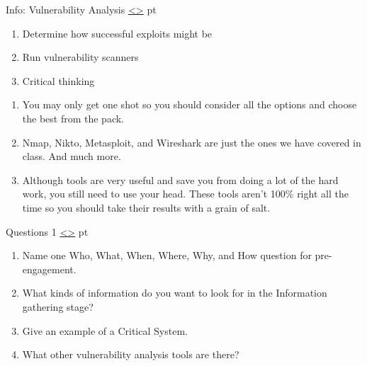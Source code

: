 \documentclass[12pt]{extarticle}
\newenvironment{instructionblock}{\Large\bgroup}{\egroup}
\newcounter{next}
\newcounter{prev}
\begin{document}
\pagebreak
{}
\begin{slide}{Info: Vulnerability Analysis}
{\hyperref[slide \theprev]{\textless}\hyperref[slide \thenext]{\textgreater}}
	 pt
	\begin{instructionblock}
		\begin{enumerate}
            \item Determine how successful exploits might be
            \item Run vulnerability scanners
            \item Critical thinking
		\end{enumerate}
	\end{instructionblock}
\end{slide}
\begin{enumerate}
\item You may only get one shot so you should consider all the options and choose the best from the pack. \cite[Chapter 6]{Ref:Weidman}
\item Nmap, Nikto, Metasploit, and Wireshark are just the ones we have covered in class. And much more. \cite[Chapter 6]{Ref:Weidman}
\item Although tools are very useful and save you from doing a lot of the hard work, you still need to use your head. These tools aren't 100\% right all the time so you should take their results with a grain of salt. \cite[Chapter 6]{Ref:Weidman}
\end{enumerate}

\pagebreak
{}
\begin{slide}{Questions 1}
{\hyperref[slide \theprev]{\textless}\hyperref[slide \thenext]{\textgreater}}
	 pt
	\begin{instructionblock}
		\begin{enumerate}
            \item Name one Who, What, When, Where, Why, and How question for pre-engagement.
            \item What kinds of information do you want to look for in the Information gathering stage?
            \item Give an example of a Critical System.
            \item What other vulnerability analysis tools are there?
		\end{enumerate}
	\end{instructionblock}
\end{slide}
\end{document}
